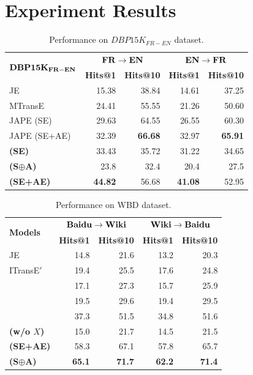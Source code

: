 \section{Experiment Results\label{sec:results}}


\begin{table}
	\centering
	\scriptsize
	\begin{tabular}{lrrrr}
		\toprule
		\multirow{2}{*}{$\bf DBP15K_{FR-EN}$} & \multicolumn{2}{c|}{$\bf FR \rightarrow EN$} & \multicolumn{2}{c}{$\bf EN \rightarrow FR$} \\
		& \bf Hits@1 & \bf Hits@10 & \bf Hits@1 & \bf Hits@10 \\
		\midrule
		\rowcolor{Gray}JE & 15.38 & 38.84 & 14.61 & 37.25 \\
		MTransE & 24.41 & 55.55 & 21.26 & 50.60 \\
		\rowcolor{Gray}JAPE (SE) & 29.63 & 64.55 & 26.55 & 60.30 \\
		JAPE (SE+AE) & 32.39 & \bf 66.68 & 32.97 & \bf 65.91 \\
		\rowcolor{Gray} \bf \HRGCN (SE) & 33.43& 35.72& 31.22& 34.65 \\
		\bf \HRGCN (S$\oplus$A) & 23.8 & 32.4 & 20.4 & 27.5 \\
        \rowcolor{Gray} 	\bf \HRGCN (SE+AE) & \bf 44.82 & 56.68 &\bf 41.08 & 52.95 \\
		\bottomrule
	\end{tabular}
	\caption{Performance on $DBP15K_{FR-EN}$ dataset.}
	\label{cross}
\end{table}

\begin{table}
	\centering
	\scriptsize
	\begin{tabular}{lrrrr}
		\toprule
		\multirow{2}{*}{\bf Models} &  \multicolumn{2}{c|}{$\bf Baidu \rightarrow Wiki$} & \multicolumn{2}{c}{$\bf Wiki \rightarrow Baidu$} \\
		& \bf Hits@1 & \bf Hits@10 & \bf Hits@1 & \bf Hits@10 \\
		\midrule
		\rowcolor{Gray} JE & 14.8 & 21.6 & 13.2 & 20.3 \\
		ITransE$'$ & 19.4 & 25.5 & 17.6 & 24.8 \\
		\rowcolor{Gray} \GCN & 17.1 & 27.3 & 15.7 & 25.9 \\
		\HGCN & 19.5 & 29.6 & 19.4 & 29.5  \\
		\rowcolor{Gray} \RGCN & 37.3 & 51.5 & 34.8 & 51.6 \\
		\bf \HRGCN (w/o $X$) & 15.0 & 21.7 & 14.5 & 21.5 \\
		\rowcolor{Gray} \bf \HRGCN (SE+AE) & 58.3 & 67.1 & 57.8{\tiny } & 65.7 \\
		\bf \HRGCN (S$\oplus$A) & \bf 65.1 & \bf 71.7 & \bf 62.2 & \bf 71.4\\
		\bottomrule
	\end{tabular}
	\caption{Performance on WBD dataset.}
	\label{f1}
\end{table}
